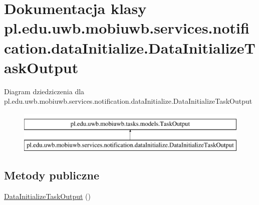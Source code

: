 \hypertarget{classpl_1_1edu_1_1uwb_1_1mobiuwb_1_1services_1_1notification_1_1data_initialize_1_1_data_initialize_task_output}{}\section{Dokumentacja klasy pl.\+edu.\+uwb.\+mobiuwb.\+services.\+notification.\+data\+Initialize.\+Data\+Initialize\+Task\+Output}
\label{classpl_1_1edu_1_1uwb_1_1mobiuwb_1_1services_1_1notification_1_1data_initialize_1_1_data_initialize_task_output}
Diagram dziedziczenia dla pl.\+edu.\+uwb.\+mobiuwb.\+services.\+notification.\+data\+Initialize.\+Data\+Initialize\+Task\+Output\begin{figure}[H]
\begin{center}
\leavevmode
\includegraphics[height=2.000000cm]{classpl_1_1edu_1_1uwb_1_1mobiuwb_1_1services_1_1notification_1_1data_initialize_1_1_data_initialize_task_output}
\end{center}
\end{figure}
\subsection*{Metody publiczne}
\begin{DoxyCompactItemize}
\item 
\hyperlink{classpl_1_1edu_1_1uwb_1_1mobiuwb_1_1services_1_1notification_1_1data_initialize_1_1_data_initialize_task_output_a40ecef76aab1a6223ed1faffc6fad02f}{Data\+Initialize\+Task\+Output} ()
\end{DoxyCompactItemize}
